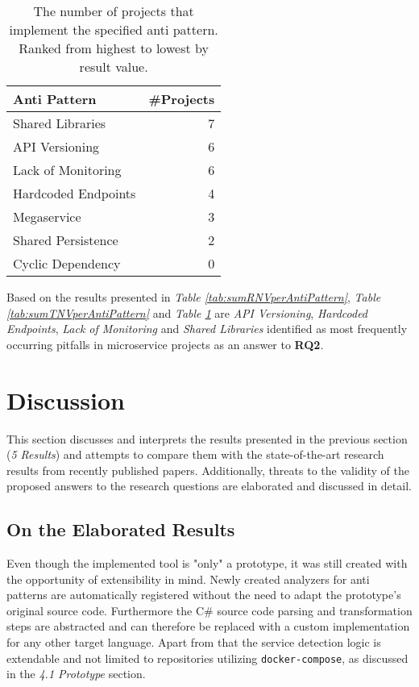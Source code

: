 \documentclass{article}
\begin{document}
\begin{table}[h!]
\begin{center}
\begin{tabular}{|l|r|}
\hline
Anti Pattern        & \multicolumn{1}{c|}{\#Projects} \\ \hline \hline
Shared Libraries    & 7                               \\ \hline
API Versioning      & 6                               \\ \hline
Lack of Monitoring  & 6                               \\ \hline
Hardcoded Endpoints & 4                               \\ \hline
Megaservice         & 3                               \\ \hline
Shared Persistence  & 2                               \\ \hline
Cyclic Dependency   & 0                               \\ \hline
\end{tabular}
\caption{The number of projects that implement the specified anti pattern. Ranked from highest to lowest by result value.}
\label{tab:numberProjectsImplementingAntiPattern}
\end{center}
\end{table}

\pagebreak
Based on the results presented in \textit{Table \ref{tab:sumRNVperAntiPattern}}, \textit{Table \ref{tab:sumTNVperAntiPattern}} and \textit{Table \ref{tab:numberProjectsImplementingAntiPattern}} are \textit{API Versioning}, \textit{Hardcoded Endpoints}, \textit{Lack of Monitoring} and \textit{Shared Libraries} identified as most frequently occurring pitfalls in microservice projects as an answer to \textbf{RQ2}.

\section{Discussion}
This section discusses and interprets the results presented in the previous section (\textit{5 Results}) and attempts to compare them with the state-of-the-art research results from recently published papers.
Additionally, threats to the validity of the proposed answers to the research questions are elaborated and discussed in detail.

\subsection{On the Elaborated Results}
Even though the implemented tool is "only" a prototype, it was still created with the opportunity of extensibility in mind.
Newly created analyzers for anti patterns are automatically registered without the need to adapt the prototype's original source code.
Furthermore the C\# source code parsing and transformation steps are abstracted and can therefore be replaced with a custom implementation for any other target language.
Apart from that the service detection logic is extendable and not limited to repositories utilizing \lstinline{docker-compose}, as discussed in the \textit{4.1 Prototype} section. \newline
\end{document}
